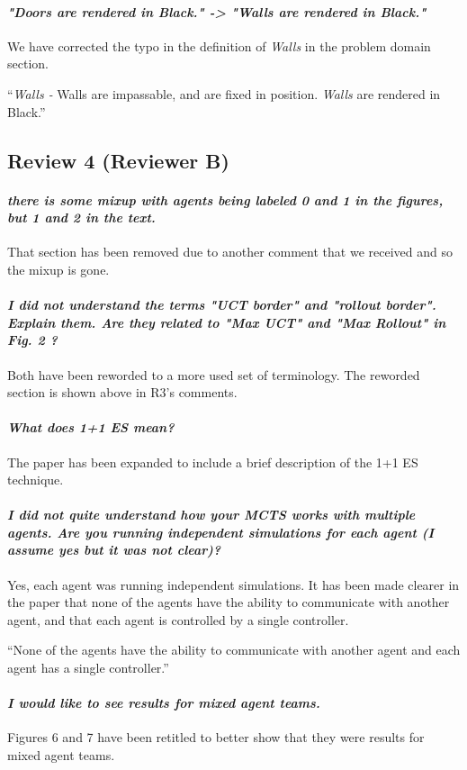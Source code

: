 \documentclass{article}
\begin{document}
\paragraph*{\textit{"Doors are rendered in Black." -> "Walls are rendered in Black."}}
We have corrected the typo in the definition of \emph{Walls} in the problem domain section.

``\emph{Walls -} Walls are impassable, and are fixed in position. \emph{Walls} are rendered in Black.''
\subsection{Review 4 (Reviewer B)}
\paragraph*{\textit{there is some mixup with agents being labeled 0 and 1 in the figures, but 1 and 2 in the text.}}
That section has been removed due to another comment that we received and so the mixup is gone.

\paragraph*{\textit{I did not understand the terms "UCT border" and "rollout border". Explain them. Are they related to "Max UCT" and "Max Rollout" in Fig. 2 ?}}
Both have been reworded to a more used set of terminology. The reworded section is shown above in R3's comments.
\paragraph*{\textit{What does 1+1 ES mean?}}
The paper has been expanded to include a brief description of the 1+1 ES technique.
\paragraph*{\textit{I did not quite understand how your MCTS works with multiple agents. Are you running independent simulations for each agent (I assume yes but it was not clear)? }}
Yes, each agent was running independent simulations. It has been made clearer in the paper that none of the agents have the ability to communicate with another agent, and that each agent is controlled by a single controller.

``None of the agents have the ability to communicate with another agent and each agent has a single controller.''
\paragraph*{\textit{I would like to see results for mixed agent teams.}}
Figures 6 and 7 have been retitled to better show that they were results for mixed agent teams.
\end{document}
